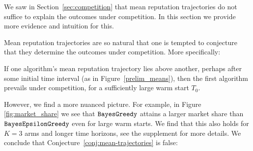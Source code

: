 \documentclass[../competing_bandits_with_appendix.tex]{subfiles}
\begin{document}
We saw in Section~\ref{sec:competition} that mean reputation trajectories do not suffice to explain the outcomes under competition. In this section we provide more evidence and intuition for this.

Mean reputation trajectories are so natural that one is tempted to conjecture that they determine the outcomes under competition. More specifically:
\begin{conjecture}\label{conj:mean-trajectories}
If one algorithm's mean reputation trajectory lies above another, perhaps after some initial time interval (\eg as in Figure~\ref{prelim_means}), then the first algorithm prevails under competition, for a sufficiently large warm start $T_0$.
\end{conjecture}

However, we find a more nuanced picture. For example, in Figure \ref{fig:market_share} we see that $\mathtt{BayesGreedy}$ attains a larger market share than $\mathtt{BayesEpsilonGreedy}$ even for large warm starts. We find that this also holds for $K = 3$ arms and longer time horizons, see the supplement for more details. We conclude that Conjecture~\ref{conj:mean-trajectories} is false:
\end{document}
